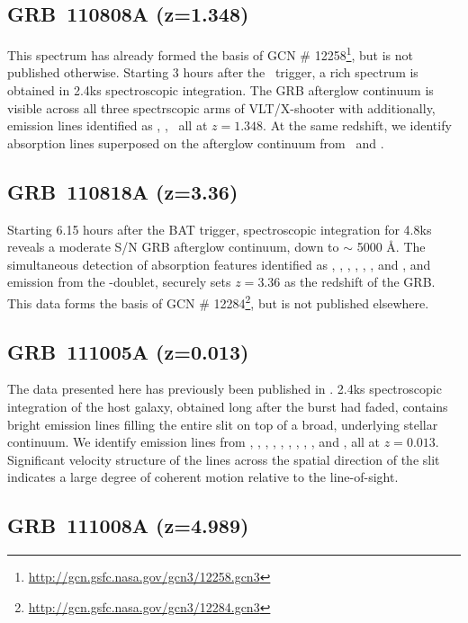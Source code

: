 \documentclass{aa}    %
\begin{document}
\subsection{GRB~110808A (z=1.348)}

This spectrum has already formed the basis of GCN \#
12258\footnote{\url{http://gcn.gsfc.nasa.gov/gcn3/12258.gcn3}}, but is not
published otherwise. Starting 3 hours after the \swift~trigger, a rich spectrum
is obtained in 2.4ks spectroscopic integration. The GRB afterglow continuum is
visible across all three spectrscopic arms of VLT/X-shooter with additionally,
emission lines identified as \oii, \oiii, \ha~all at $z = 1.348$. At the same
redshift, we identify absorption lines superposed on the afterglow continuum
from \mgii~and \feii.

\subsection{GRB~110818A (z=3.36)}

Starting 6.15 hours after the BAT trigger, spectroscopic integration for 4.8ks
reveals a moderate S/N GRB afterglow continuum, down to $\sim$ 5000 \AA. The
simultaneous detection of absorption features identified as \lya, \SIii, \civ,
\alii, \cah, \cak, and \mgii, and emission from the \oiii-doublet, securely sets
$z = 3.36$ as the redshift of the GRB. This data forms the basis of GCN \#
12284\footnote{\url{http://gcn.gsfc.nasa.gov/gcn3/12284.gcn3}}, but is not
published elsewhere.

\subsection{GRB~111005A (z=0.013)}

The data presented here has previously been published in \citet{Michaowski2016}.
2.4ks spectroscopic integration of the host galaxy, obtained long after the
burst had faded, contains bright emission lines filling the entire slit on top
of a broad, underlying stellar continuum. We identify emission lines from \oii,
\hd, \hg, \hb, \oiii, \nii, \hb, \sii, \ariii, and \sii, all at $z=0.013$.
Significant velocity structure of the lines across the spatial direction of the
slit indicates a large degree of coherent motion relative to the line-of-sight.


\subsection{GRB~111008A  (z=4.989)}
\end{document}
